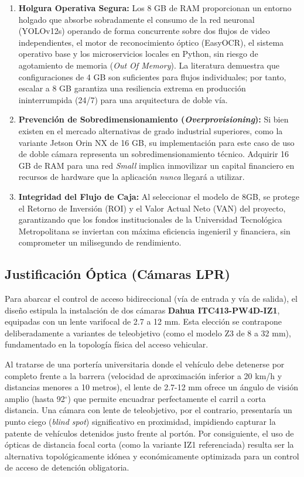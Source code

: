 \begin{enumerate}
    \item \textbf{Holgura Operativa Segura:} Los 8 GB de RAM proporcionan un entorno holgado que absorbe sobradamente el consumo de la red neuronal (YOLOv12s) operando de forma concurrente sobre dos flujos de video independientes, el motor de reconocimiento óptico (EasyOCR), el sistema operativo base y los microservicios locales en Python, sin riesgo de agotamiento de memoria (\textit{Out Of Memory}). La literatura demuestra que configuraciones de 4 GB son suficientes para flujos individuales; por tanto, escalar a 8 GB garantiza una resiliencia extrema en producción ininterrumpida (24/7) para una arquitectura de doble vía.
    \item \textbf{Prevención de Sobredimensionamiento (\textit{Overprovisioning}):} Si bien existen en el mercado alternativas de grado industrial superiores, como la variante Jetson Orin NX de 16 GB, su implementación para este caso de uso de doble cámara representa un sobredimensionamiento técnico. Adquirir 16 GB de RAM para una red \textit{Small} implica inmovilizar un capital financiero en recursos de hardware que la aplicación \textit{nunca} llegará a utilizar.
    \item \textbf{Integridad del Flujo de Caja:} Al seleccionar el modelo de 8GB, se protege el Retorno de Inversión (ROI) y el Valor Actual Neto (VAN) del proyecto, garantizando que los fondos institucionales de la Universidad Tecnológica Metropolitana se inviertan con máxima eficiencia ingenieril y financiera, sin comprometer un milisegundo de rendimiento.
\end{enumerate}

\subsection{Justificación Óptica (Cámaras LPR)}

Para abarcar el control de acceso bidireccional (vía de entrada y vía de salida), el diseño estipula la instalación de dos cámaras \textbf{Dahua ITC413-PW4D-IZ1}, equipadas con un lente varifocal de 2.7 a 12 mm. Esta elección se contrapone deliberadamente a variantes de teleobjetivo (como el modelo Z3 de 8 a 32 mm), fundamentado en la topología física del acceso vehicular. 

Al tratarse de una portería universitaria donde el vehículo debe detenerse por completo frente a la barrera (velocidad de aproximación inferior a 20 km/h y distancias menores a 10 metros), el lente de 2.7-12 mm ofrece un ángulo de visión amplio (hasta 92$^\circ$) que permite encuadrar perfectamente el carril a corta distancia. Una cámara con lente de teleobjetivo, por el contrario, presentaría un punto ciego (\textit{blind spot}) significativo en proximidad, impidiendo capturar la patente de vehículos detenidos justo frente al portón. Por consiguiente, el uso de ópticas de distancia focal corta (como la variante IZ1 referenciada) resulta ser la alternativa topológicamente idónea y económicamente optimizada para un control de acceso de detención obligatoria.

